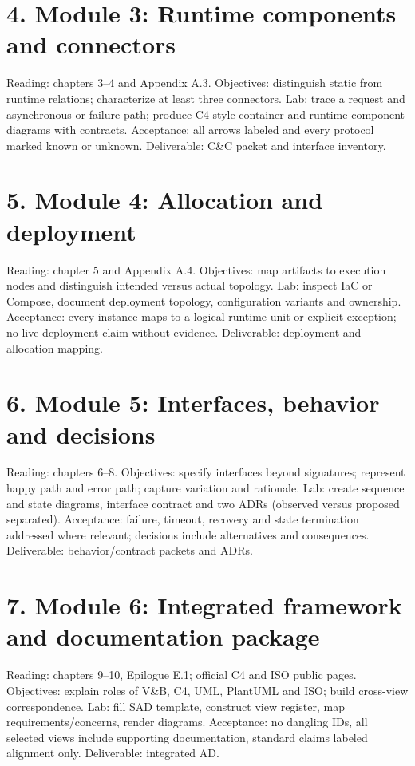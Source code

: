 \documentclass[11pt,letterpaper]{article}
\begin{document}
\section*{4. Module 3: Runtime components and connectors}
Reading: chapters 3--4 and Appendix A.3. Objectives: distinguish static from runtime relations; characterize at least three connectors. Lab: trace a request and asynchronous or failure path; produce C4-style container and runtime component diagrams with contracts. Acceptance: all arrows labeled and every protocol marked known or unknown. Deliverable: C\&C packet and interface inventory.\par\smallskip
\section*{5. Module 4: Allocation and deployment}
Reading: chapter 5 and Appendix A.4. Objectives: map artifacts to execution nodes and distinguish intended versus actual topology. Lab: inspect IaC or Compose, document deployment topology, configuration variants and ownership. Acceptance: every instance maps to a logical runtime unit or explicit exception; no live deployment claim without evidence. Deliverable: deployment and allocation mapping.\par\smallskip
\section*{6. Module 5: Interfaces, behavior and decisions}
Reading: chapters 6--8. Objectives: specify interfaces beyond signatures; represent happy path and error path; capture variation and rationale. Lab: create sequence and state diagrams, interface contract and two ADRs (observed versus proposed separated). Acceptance: failure, timeout, recovery and state termination addressed where relevant; decisions include alternatives and consequences. Deliverable: behavior/contract packets and ADRs.\par\smallskip
\section*{7. Module 6: Integrated framework and documentation package}
Reading: chapters 9--10, Epilogue E.1; official C4 and ISO public pages. Objectives: explain roles of V\&B, C4, UML, PlantUML and ISO; build cross-view correspondence. Lab: fill SAD template, construct view register, map requirements/concerns, render diagrams. Acceptance: no dangling IDs, all selected views include supporting documentation, standard claims labeled alignment only. Deliverable: integrated AD.\par\smallskip
\end{document}
